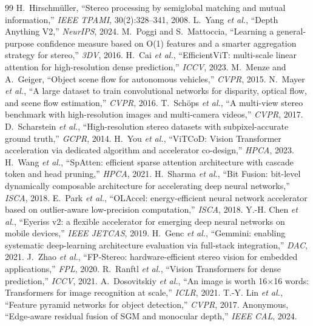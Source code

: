 \documentclass[lettersize,journal]{IEEEtran}
\begin{document}
\begin{thebibliography}{99}
 H.~Hirschm\"uller, ``Stereo processing by semiglobal matching and mutual information,'' \emph{IEEE TPAMI}, 30(2):328--341, 2008.
 L.~Yang \emph{et al.}, ``Depth Anything V2,'' \emph{NeurIPS}, 2024.
 M.~Poggi and S.~Mattoccia, ``Learning a general-purpose confidence measure based on O(1) features and a smarter aggregation strategy for stereo,'' \emph{3DV}, 2016.
 H.~Cai \emph{et al.}, ``EfficientViT: multi-scale linear attention for high-resolution dense prediction,'' \emph{ICCV}, 2023.
 M.~Menze and A.~Geiger, ``Object scene flow for autonomous vehicles,'' \emph{CVPR}, 2015.
 N.~Mayer \emph{et al.}, ``A large dataset to train convolutional networks for disparity, optical flow, and scene flow estimation,'' \emph{CVPR}, 2016.
 T.~Sch\"ops \emph{et al.}, ``A multi-view stereo benchmark with high-resolution images and multi-camera videos,'' \emph{CVPR}, 2017.
 D.~Scharstein \emph{et al.}, ``High-resolution stereo datasets with subpixel-accurate ground truth,'' \emph{GCPR}, 2014.
 H.~You \emph{et al.}, ``ViTCoD: Vision Transformer acceleration via dedicated algorithm and accelerator co-design,'' \emph{HPCA}, 2023.
 H.~Wang \emph{et al.}, ``SpAtten: efficient sparse attention architecture with cascade token and head pruning,'' \emph{HPCA}, 2021.
 H.~Sharma \emph{et al.}, ``Bit Fusion: bit-level dynamically composable architecture for accelerating deep neural networks,'' \emph{ISCA}, 2018.
 E.~Park \emph{et al.}, ``OLAccel: energy-efficient neural network accelerator based on outlier-aware low-precision computation,'' \emph{ISCA}, 2018.
 Y.-H. Chen \emph{et al.}, ``Eyeriss v2: a flexible accelerator for emerging deep neural networks on mobile devices,'' \emph{IEEE JETCAS}, 2019.
 H.~Genc \emph{et al.}, ``Gemmini: enabling systematic deep-learning architecture evaluation via full-stack integration,'' \emph{DAC}, 2021.
 J.~Zhao \emph{et al.}, ``FP-Stereo: hardware-efficient stereo vision for embedded applications,'' \emph{FPL}, 2020.
 R.~Ranftl \emph{et al.}, ``Vision Transformers for dense prediction,'' \emph{ICCV}, 2021.
 A.~Dosovitskiy \emph{et al.}, ``An image is worth 16$\times$16 words: Transformers for image recognition at scale,'' \emph{ICLR}, 2021.
 T.-Y. Lin \emph{et al.}, ``Feature pyramid networks for object detection,'' \emph{CVPR}, 2017.
 Anonymous, ``Edge-aware residual fusion of SGM and monocular depth,'' \emph{IEEE CAL}, 2024.
\end{thebibliography}
\end{document}
